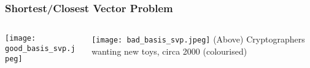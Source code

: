 \documentclass[
aspectratio=169, %
t, %
onlytextwidth, %
10pt, %
]{beamer}
\begin{document}

\begin{frame}
    \frametitle{Shortest/Closest Vector Problem}
    \begin{columns}[T] %
        \begin{column}{0.48\linewidth} %
            \texttt{[image: good\_basis\_svp.jpeg]} %
        \end{column}
        \begin{column}{0.48\linewidth} %
            \texttt{[image: bad\_basis\_svp.jpeg]} %
            {\tiny\textcolor{ICLBlue}{(Above) Cryptographers wanting new toys, circa 2000 (colourised)}}
        \end{column}
    \end{columns}
\end{frame}

\end{document}
